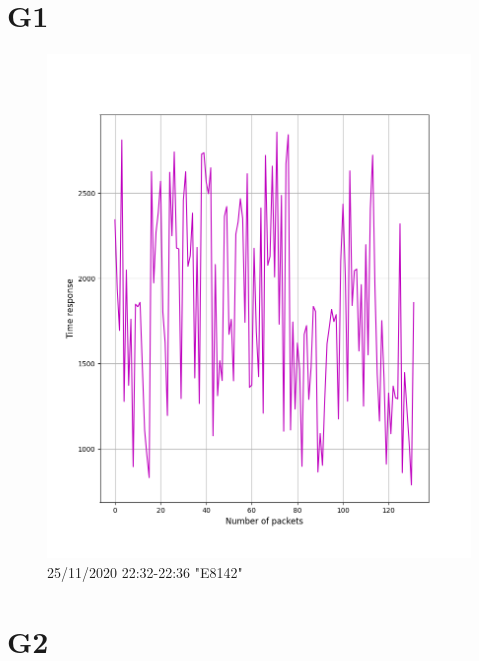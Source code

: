 \documentclass[hidelinks, 12pt, a4paper]{article}
\begin{document}



\pagebreak
\tableofcontents
\pagebreak



\section{G1}

\begin{figure}[h!]
\centering
	\includegraphics[height=.38\textheight, width=\textwidth]{assets/session1/g1.png}
	\caption{25/11/2020 22:32-22:36 "E8142"} 
\end{figure}

\section{G2}
\end{document}
